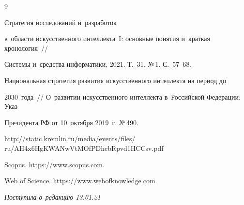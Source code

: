 {\small\frenchspacing


{%




\begin{thebibliography}{9}












 Стратегия исследований и~разработок 


в~об\-ласти искусственного интеллекта~I: основные понятия и~краткая хронология~/\!\!/ 


Сис\-те\-мы и~средства информатики, 2021. Т.~31. №\,1. С.~57--68.




Национальная стратегия развития искусственного интеллекта на период до 


2030~года~/\!\!/ О~развитии искусственного интеллекта в~Российской Федерации: Указ 


Президента РФ от 10~октября 2019~г. №\,490.


{\sf http://static.kremlin.ru/media/events/files/ ru/AH4x6HgKWANwVtMOfPDhcbRpvd1HCCsv.pdf}




Scopus. {\sf https://www.scopus.com}.




Web of Science. {\sf https://www.webofknowledge.com}.


\end{thebibliography}


} }











\vspace*{-4pt}





\hfill{\small\textit{Поступила в~редакцию 13.01.21}}










